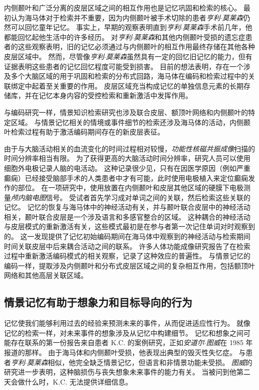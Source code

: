 内侧颞叶和广泛分离的皮层区域之间的相互作用也是记忆巩固和检索的核心。
最初认为海马体对于检索并不重要，因为内侧颞叶被手术切除的患者\textit{亨利$\cdot$莫莱森}仍然可以回忆童年记忆。
事实上，早期的观察表明直到\textit{亨利$\cdot$莫莱森}手术前几年，他都能回忆起他生活中的许多经历。
对\textit{亨利$\cdot$莫莱森}和其他内侧颞叶受损的遗忘症患者的这些观察表明，旧的记忆必须通过与内侧颞叶的相互作用最终存储在其他各种皮层区域中。
然而，尽管像\textit{亨利$\cdot$莫莱森}虽然具有一定的回忆旧记忆的能力，但有证据表明这些患者的记忆回忆程度可能受到损害。
目前的想法表明，存在一个涉及多个大脑区域的用于巩固和检索的分布式回路，海马体在编码和检索过程中的关联绑定中起着至关重要的作用。
皮层区域充当构成记忆的单独信息元素的长期存储库，并在记忆本身内容的受控检索和重新激活中发挥作用。


与编码研究一样，情景知识检索研究也涉及联合皮层、额顶叶网络和内侧颞叶的特定区域。
与情景记忆相关的情境或事件细节的检索还涉及海马体的活动，内侧颞叶检索过程有助于激活编码期间存在的新皮层表征。


由于与大脑活动相关的血流变化的时间过程相对较慢，\textit{功能性核磁共振成像}扫描的时间分辨率相当有限。
为了获得更高的大脑活动时间分辨率，研究人员可以使用细胞外电极记录人脑的电活动。
这种记录很少见，只有在因医学原因（例如严重癫痫）已经接受脑部手术的人类患者中才有可能，此时使用电极植入来定位癫痫发作的部位。
在一项研究中，使用放置在内侧颞叶和皮层其他区域的硬膜下电极测量\textit{颅内脑电图}信号。
受试者首先学习成对单词之间的关联，然后检索这些关联的记忆。
记忆的恢复与海马体中的神经活动有关，并与颞叶联合皮层中的神经活动相关，颞叶联合皮层是一个涉及语言和多感官整合的区域。
这种耦合的神经活动与皮层模式的重新激活有关，这些模式最初是在参与者第一次记住单词对时观察到的。
这一发现提供了记忆初始编码期间在海马体中观察到的神经活动与检索期间时间关联皮层中后来耦合活动之间的联系。
许多人体功能成像研究报告了在检索过程中重新激活编码模式的相关观察，记录了这种效应的普遍性。
与情景记忆的编码一样，提取涉及内侧颞叶和分布式皮层区域之间的复杂相互作用，包括额顶叶网络和其他高层关联区域。



\subsection{情景记忆有助于想象力和目标导向的行为}

记忆使我们能够利用过去的经验来预测未来的事件，从而促进适应性行为。
就像记忆的检索一样，对未来事件的想象涉及从记忆中构建细节。
记忆和想象之间可能存在联系的第一份报告来自患者 K.C. 的案例研究，正如\textit{安道尔$\cdot$图威}在 1985 年报道的那样。
由于海马体和内侧颞叶受损，他表现出典型的毁灭性失忆症。
与患者\textit{亨利$\cdot$莫莱森}相似，他完全缺乏情景记忆，但语言和非情景功能未受损。
\textit{图威}的研究进一步表明，这种脑损伤与丧失想象未来事件的能力有关。
当被问到他第二天会做什么时，K.C. 无法提供详细信息。



